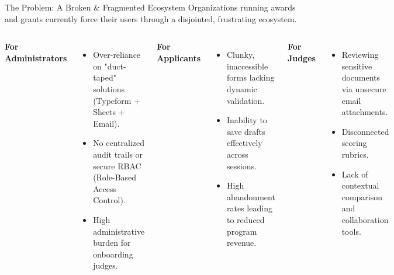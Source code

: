 \documentclass[aspectratio=169, 10pt]{beamer}
\begin{document}
\begin{frame}{The Problem: A Broken \& Fragmented Ecosystem}
    Organizations running awards and grants currently force their users through a disjointed, frustrating ecosystem.
    
    \vspace{0.4cm}
    \begin{columns}[T]
        \textbf{For Administrators}
        \begin{itemize}
            \item \small Over-reliance on "duct-taped" solutions (Typeform + Sheets + Email).
            \item \small No centralized audit trails or secure RBAC (Role-Based Access Control).
            \item \small High administrative burden for onboarding judges.
        \end{itemize}
        
        \textbf{For Applicants}
        \begin{itemize}
            \item \small Clunky, inaccessible forms lacking dynamic validation.
            \item \small Inability to save drafts effectively across sessions.
            \item \small High abandonment rates leading to reduced program revenue.
        \end{itemize}
        
        \textbf{For Judges}
        \begin{itemize}
            \item \small Reviewing sensitive documents via unsecure email attachments.
            \item \small Disconnected scoring rubrics.
            \item \small Lack of contextual comparison and collaboration tools.
        \end{itemize}
    \end{columns}
\end{frame}
\end{document}
